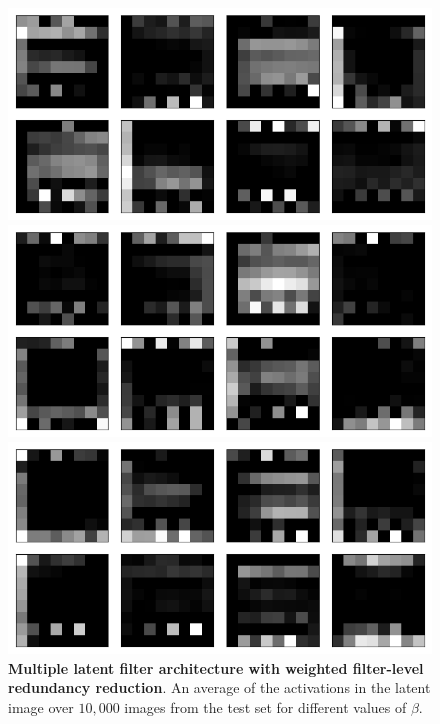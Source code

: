\begin{figure}[h!]
\centering
\captionsetup{justification=centering}

    \includegraphics[scale=0.42]{figures/results/weighted_average/beta_1_average_activation.png}
    \caption{$\beta=1$}
    \includegraphics[scale=0.42]{figures/results/weighted_average/beta_2_average_activation.png}
    \caption{$\beta=2$}
    \includegraphics[scale=0.42]{figures/results/weighted_average/beta_4_average_activation.png}
    \caption{$\beta=4$}

\caption{\textbf{Multiple latent filter architecture with weighted filter-level redundancy reduction}. An average of the activations in the latent image over $10,000$ images from the test set for different values of $\beta$.}
\label{fig:weighted_average_originals_posterior_samples}
\end{figure}





